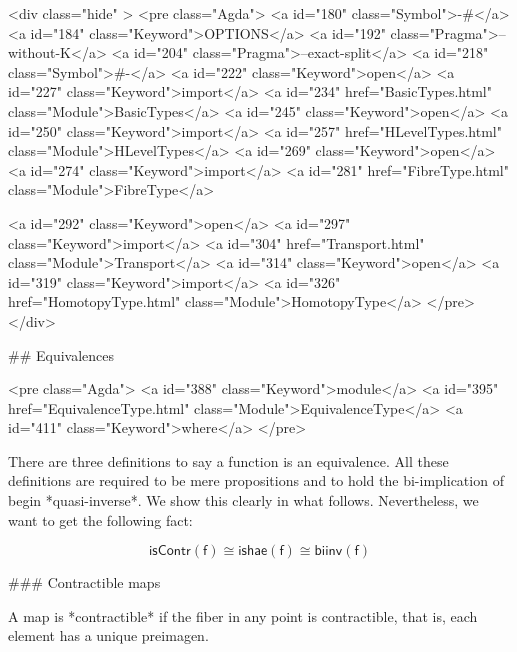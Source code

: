   <div class="hide" >
<pre class="Agda">
<a id="180" class="Symbol">{-#</a> <a id="184" class="Keyword">OPTIONS</a> <a id="192" class="Pragma">--without-K</a> <a id="204" class="Pragma">--exact-split</a> <a id="218" class="Symbol">#-}</a>
<a id="222" class="Keyword">open</a> <a id="227" class="Keyword">import</a> <a id="234" href="BasicTypes.html" class="Module">BasicTypes</a>
<a id="245" class="Keyword">open</a> <a id="250" class="Keyword">import</a> <a id="257" href="HLevelTypes.html" class="Module">HLevelTypes</a>
<a id="269" class="Keyword">open</a> <a id="274" class="Keyword">import</a> <a id="281" href="FibreType.html" class="Module">FibreType</a>

<a id="292" class="Keyword">open</a> <a id="297" class="Keyword">import</a> <a id="304" href="Transport.html" class="Module">Transport</a>
<a id="314" class="Keyword">open</a> <a id="319" class="Keyword">import</a> <a id="326" href="HomotopyType.html" class="Module">HomotopyType</a>
</pre>
</div>

## Equivalences

<pre class="Agda">
<a id="388" class="Keyword">module</a> <a id="395" href="EquivalenceType.html" class="Module">EquivalenceType</a> <a id="411" class="Keyword">where</a>
</pre>

There are three definitions to say a function is an
equivalence. All these definitions
are required to be mere propositions and to hold
the bi-implication of begin *quasi-inverse*. We show
this clearly in what follows. Nevertheless, we want to get
the following fact:

$$ \mathsf{isContr(f)} \cong \mathsf{ishae(f)} \cong \mathsf{biinv(f)} $$

### Contractible maps

A map is *contractible* if the fiber in any point is contractible, that is, each
element has a unique preimagen.

